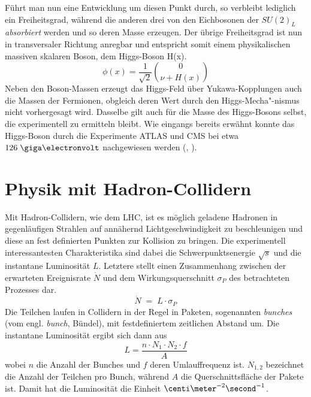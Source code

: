 Führt man nun eine Entwicklung um diesen Punkt durch, so verbleibt lediglich
ein Freiheitsgrad, während die anderen drei von den Eichbosonen der $SU(2)_L$
\textit{absorbiert} werden und so deren Masse erzeugen. Der übrige
Freiheitsgrad ist nun in transversaler Richtung anregbar und entspricht somit
einem physikalischen massiven skalaren Boson, dem Higgs-Boson H(x).
\begin{equation}
    \phi(x) = \frac{1}{\sqrt{2}}\binom{0}{\nu+H(x)}
\end{equation}
Neben den Boson-Massen erzeugt das Higgs-Feld über Yukawa-Kopplungen auch die
Massen der Fermionen, obgleich deren Wert durch den Higgs-Mecha"-nismus nicht
vorhergesagt wird. Dasselbe gilt auch für die Masse des Higgs-Bosons selbst,
die experimentell zu ermitteln bleibt. Wie eingangs bereits erwähnt konnte das
Higgs-Boson durch die Experimente ATLAS und CMS bei etwa $126\GeV$ nachgewiesen
werden (\cite{Aad:2012tfa}, \cite{Chatrchyan:2013lba}).



\section{Physik mit Hadron-Collidern}
\label{theory:hadron_collider}


Mit Hadron-Collidern, wie dem \ac{LHC}, ist es möglich geladene Hadronen in
gegenläufigen Strahlen auf annähernd Lichtgeschwindigkeit zu beschleunigen und
diese an fest definierten Punkten zur Kollision zu bringen. Die experimentell
interessantesten Charakteristika sind dabei die Schwerpunktsenergie $\sqrt{s}$
und die instantane Luminosität $L$. Letztere stellt einen Zusammenhang zwischen
der erwarteten Ereignisrate $\dot N$ und dem Wirkungsquerschnitt $\sigma_P$ des
betrachteten Prozesses dar.
\begin{equation}
    \dot N \;=\; L \cdot \sigma_P
\end{equation}
Die Teilchen laufen in Collidern in der Regel in Paketen, sogenannten
\textit{bunches} (vom engl. \textit{bunch}, Bündel), mit festdefiniertem
zeitlichen Abstand um. Die instantane Luminosität ergibt sich dann aus
\begin{equation}
    L = \frac{n \cdot N_1 \cdot  N_2 \cdot f}{A}
    \label{eq:collider_lumi}
\end{equation}
wobei $n$ die Anzahl der Bunches und $f$ deren Umlauffrequenz ist. $N_{1,2}$
bezeichnet die Anzahl der Teilchen pro Bunch, während $A$ die
Querschnittsfläche der Pakete ist. Damit hat die Luminosität die Einheit
$\centi\meter^{-2}\second^{-1}$.


